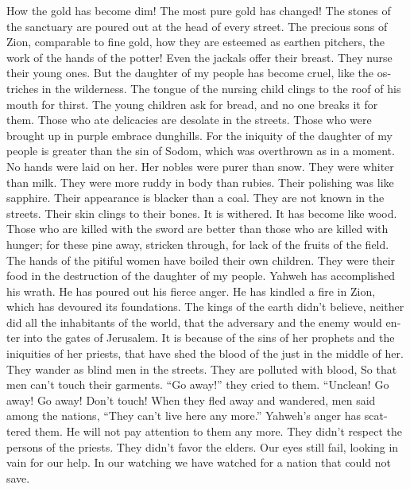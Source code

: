 \begin{paracol}{2}
\begin{otherlanguage}{english}
 How the gold has become dim! The most pure gold has
changed! The stones of the sanctuary are poured out at the head of every
street.  The precious sons of Zion, comparable to fine
gold, how they are esteemed as earthen pitchers, the work of the hands
of the potter!  Even the jackals offer their breast. They
nurse their young ones. But the daughter of my people has become cruel,
like the ostriches in the wilderness.  The tongue of the
nursing child clings to the roof of his mouth for thirst. The young
children ask for bread, and no one breaks it for them. 
Those who ate delicacies are desolate in the streets. Those who were
brought up in purple embrace dunghills.  For the iniquity
of the daughter of my people is greater than the sin of Sodom, which was
overthrown as in a moment. No hands were laid on her.  Her
nobles were purer than snow. They were whiter than milk. They were more
ruddy in body than rubies. Their polishing was like sapphire.
 Their appearance is blacker than a coal. They are not
known in the streets. Their skin clings to their bones. It is withered.
It has become like wood.  Those who are killed with the
sword are better than those who are killed with hunger; for these pine
away, stricken through, for lack of the fruits of the field.
 The hands of the pitiful women have boiled their own
children. They were their food in the destruction of the daughter of my
people.  Yahweh has accomplished his wrath. He has poured
out his fierce anger. He has kindled a fire in Zion, which has devoured
its foundations.  The kings of the earth didn't believe,
neither did all the inhabitants of the world, that the adversary and the
enemy would enter into the gates of Jerusalem.  It is
because of the sins of her prophets and the iniquities of her priests,
that have shed the blood of the just in the middle of her.
 They wander as blind men in the streets. They are
polluted with blood, So that men can't touch their garments.
 ``Go away!'' they cried to them. ``Unclean! Go away! Go
away! Don't touch! When they fled away and wandered, men said among the
nations, ``They can't live here any more.''  Yahweh's
anger has scattered them. He will not pay attention to them any more.
They didn't respect the persons of the priests. They didn't favor the
elders.  Our eyes still fail, looking in vain for our
help. In our watching we have watched for a nation that could not save.

\end{otherlanguage}
\end{paracol}
